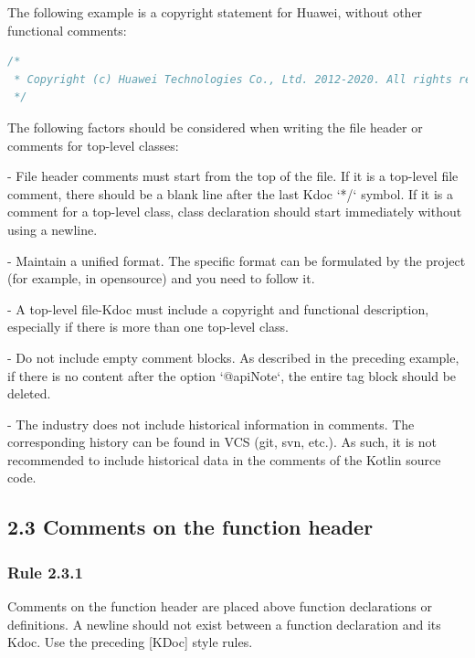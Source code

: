 The following example is a copyright statement for Huawei, without other functional comments:



\begin{lstlisting}[language=Kotlin]
/*
 * Copyright (c) Huawei Technologies Co., Ltd. 2012-2020. All rights reserved.
 */
\end{lstlisting}


The following factors should be considered when writing the file header or comments for top-level classes:

- File header comments must start from the top of the file. If it is a top-level file comment, there should be a blank line after the last Kdoc `*/` symbol. If it is a comment for a top-level class, class declaration should start immediately without using a newline.

- Maintain a unified format. The specific format can be formulated by the project (for example, in opensource) and you need to follow it.

- A top-level file-Kdoc must include a copyright and functional description, especially if there is more than one top-level class.

- Do not include empty comment blocks. As described in the preceding example, if there is no content after the option `@apiNote`, the entire tag block should be deleted.

- The industry does not include historical information in comments. The corresponding history can be found in VCS (git, svn, etc.). As such, it is not recommended to include historical data in the comments of the Kotlin source code.





\subsection*{\textbf{2.3 Comments on the function header}}

\subsubsection*{\textbf{Rule 2.3.1}}
\leavevmode\newline

Comments on the function header are placed above function declarations or definitions. A newline should not exist between a function declaration and its Kdoc. Use the preceding [KDoc] style rules.



